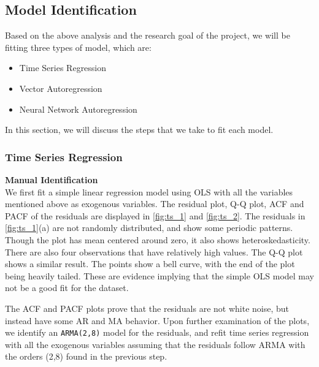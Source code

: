 \documentclass{article}\usepackage[]{graphicx}\usepackage[]{color}
\begin{document}
\subsection{Model Identification}
Based on the above analysis and the research goal of the project, we will be fitting three types of model, which are:
\begin{itemize}
    \item Time Series Regression
    \item Vector Autoregression
    \item Neural Network Autoregression
\end{itemize}

In this section, we will discuss the steps that we take to fit each model. 

\subsubsection{Time Series Regression}
\noindent\textbf{Manual Identification} \\

We first fit a simple linear regression model using OLS with all the variables mentioned above as exogenous variables. The residual plot, Q-Q plot, ACF and PACF of the residuals are displayed in \autoref{fig:ts_1} and \autoref{fig:ts_2}. The residuals in \autoref{fig:ts_1}(a) are not randomly distributed, and show some periodic patterns. Though the plot has mean centered around zero, it also shows heteroskedasticity. There are also four observations that have relatively high values. The Q-Q plot shows a similar result. The points show a bell curve, with the end of the plot being heavily tailed. These are evidence implying that the simple OLS model may not be a good fit for the dataset. 

The ACF and PACF plots prove that the residuals are not white noise, but instead have some AR and MA behavior. Upon further examination of the plots, we identify an \texttt{ARMA(2,8)} model for the residuals, and refit time series regression with all the exogenous variables assuming that the residuals follow ARMA with the orders (2,8) found in the previous step.
\end{document}
